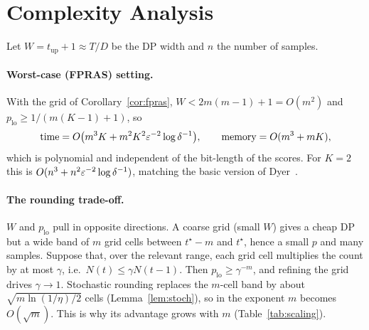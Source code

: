 \section{Complexity Analysis}\label{sec:complexity}
Let $W=t_{\mathrm{up}}+1\approx T/D$ be the DP width and $n$ the number of samples.

\begin{table}[h]\centering\small
{}
\caption{Cost of \textsc{RRDP-Rank}.}\label{tab:cost}
\end{table}

\paragraph{Worst-case (FPRAS) setting.} With the grid of Corollary~\ref{cor:fpras}, $W<2m(m-1)+1=O(m^2)$ and
$p_{\mathrm{lo}}\ge1/(m(K-1)+1)$, so
\[ \text{time}=O\big(m^3K+m^2K^2\varepsilon^{-2}\log\delta^{-1}\big),\qquad \text{memory}=O(m^3+mK), \]
which is polynomial and independent of the bit-length of the scores. For $K=2$ this is
$O(n^3+n^2\varepsilon^{-2}\log\delta^{-1})$, matching the basic version of Dyer~\cite{dyer2003}.

\paragraph{The rounding trade-off.} $W$ and $p_{\mathrm{lo}}$ pull in opposite directions. A coarse grid
(small $W$) gives a cheap DP but a wide band of $m$ grid cells between $t^\star-m$ and $t^\star$, hence a small $p$
and many samples. Suppose that, over the relevant range, each grid cell multiplies the count by at most
$\gamma$, i.e.\ $N(t)\le\gamma N(t-1)$. Then $p_{\mathrm{lo}}\ge\gamma^{-m}$, and refining the grid drives $\gamma\to1$.
Stochastic rounding replaces the $m$-cell band by about $\sqrt{m\ln(1/\eta)/2}$ cells (Lemma~\ref{lem:stoch}), so in the
exponent $m$ becomes $O(\sqrt{m})$. This is why its advantage grows with $m$ (Table~\ref{tab:scaling}).

